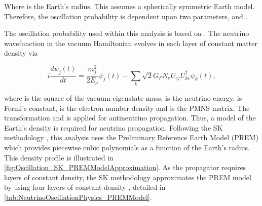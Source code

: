 Where  is the Earth's radius. This assumes a spherically symmetric Earth model. Therefore, the oscillation probability is dependent upon two parameters,  and .

The oscillation probability used within this analysis is based on \cite{Barger:1980tf}. The neutrino wavefunction in the vacuum Hamiltonian evolves in each layer of constant matter density via

\begin{equation}
  i \frac{d\psi_{j}(t)}{dt} = \frac{m_{j}^{2}}{2E_{\nu}} \psi_{j}(t) - \sum_{k} \sqrt{2} G_{F} N_{e} U_{ej} U_{ke}^{\dagger} \psi_{k}(t),
\end{equation}

where  is the square of the  vacuum eigenstate mass,  is the neutrino energy,  is Fermi's constant,  is the electron number density and  is the PMNS matrix. The transformation  and  is applied for antineutrino propagation. Thus, a model of the Earth's density is required for neutrino propagation. Following the SK methodology \cite{thesis_roger}, this analysis uses the Preliminary Reference Earth Model (PREM) \cite{Dziewonski1981-sp} which provides piecewise cubic polynomials as a function of the Earth's radius. This density profile is illustrated in \autoref{fig:Oscillation_SK_PREMModelApproximation}. As the propagator requires layers of constant density, the SK methodology approximates the PREM model by using four layers of constant density \cite{thesis_roger}, detailed in \autoref{tab:NeutrinoOscillationPhysics_PREMModel}.

